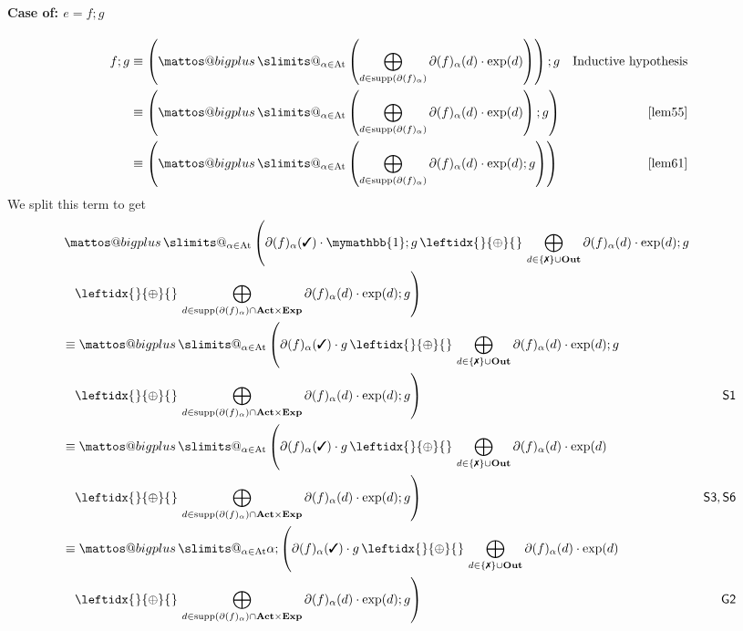\documentclass[a4paper,UKenglish,cleveref, autoref, thm-restate]{lipics-v2021}
\makeatletter
\newcommand{\cmark}{\text{\ding{51}}}
\newcommand{\xmark}{\text{\ding{55}}}
\newcommand{\Out}{\textbf{\upshape{Out}}}
\newcommand{\Act}{\textbf{\upshape{Act}}}
\newcommand{\At}{\text{\upshape{At}}}
\newcommand{\Exp}{\textbf{\upshape{Exp}}}
\newcommand{\WC}[2]{\,\leftidx{_{#1}}{{\oplus}}{_{#2}}\,}
\newcommand{\Ax}[1]{\ensuremath{\mathsf{#1}}}
\newcommand{\bskip}{\mymathbb{1}}
\theoremstyle{plain}\newtheoremrep{thm}{Theorem}[section]
\newcommand{\bigplus}{\DOTSB\mathop{\mathpalette\mattos@bigplus\relax}\slimits@
}
\newcommand\mattos@bigplus[2]{\vcenter{\hbox{\sbox\z@{$#1\sum$}\resizebox{!}{0.9\dimexpr\ht\z@+\dp\z@}{\raisebox{\depth}{$\m@th#1+$}}}}\vphantom{\sum}}
\makeatother
\begin{document}
\begin{appendixproof}
	\paragraph*{Case of: $e= f;g$}
	\begin{align*}
		f;g &\equiv \left(\bigplus_{\alpha \in \At} \left(\bigoplus_{d \in \text{supp}(\partial(f)_\alpha)}\partial(f)_\alpha(d) \cdot \text{exp}(d)\right)\right);g& \text{Inductive hypothesis}\\
		&\equiv \left(\bigplus_{\alpha \in \At} \left(\bigoplus_{d \in \text{supp}(\partial(f)_\alpha)}\partial(f)_\alpha(d) \cdot \text{exp}(d)\right);g\right)& \cref{lem55}\\
		&\equiv \left(\bigplus_{\alpha \in \At} \left(\bigoplus_{d \in \text{supp}(\partial(f)_\alpha)}\partial(f)_\alpha(d) \cdot \text{exp}(d);g\right)\right)& \cref{lem61}
	\end{align*}
	We split this term to get
	\begin{align*}
		&\bigplus_{\alpha \in \At} \left(\partial(f)_\alpha(\cmark) \cdot \bskip;g \WC{}{} \bigoplus_{{\substack{d \in \{\xmark\} \cup \Out}}}\partial(f)_\alpha(d)\cdot \text{exp}(d);g  \right. \\ &\left. \;\;\WC{}{} \bigoplus_{{\substack{d \in \text{supp}(\partial(f)_\alpha)\cap \Act\times\Exp}}}\partial(f)_\alpha(d) \cdot \text{exp}(d);g\right)\\
		&\equiv \bigplus_{\alpha \in \At} \left(\partial(f)_\alpha(\cmark) \cdot g \WC{}{}  \bigoplus_{{\substack{d \in \{\xmark\} \cup \Out}}}\partial(f)_\alpha(d) \cdot \text{exp}(d);g \right. \\ &\left.\;\;\WC{}{} \bigoplus_{{\substack{d \in \text{supp}(\partial(f)_\alpha)\cap \Act\times\Exp}}}\partial(f)_\alpha(d) \cdot \text{exp}(d);g\right) & \Ax{S1}\\
		&\equiv \bigplus_{\alpha \in \At} \left(\partial(f)_\alpha(\cmark) \cdot g \WC{}{}  \bigoplus_{{\substack{d \in \{\xmark\} \cup \Out}}}\partial(f)_\alpha(d) \cdot \text{exp}(d) \right. \\ &\left.\;\;\WC{}{} \bigoplus_{{\substack{d \in \text{supp}(\partial(f)_\alpha)\cap \Act\times\Exp}}}\partial(f)_\alpha(d) \cdot \text{exp}(d);g\right) & \Ax{S3, S6}\\
		&\equiv \bigplus_{\alpha \in \At} \alpha;\left(\partial(f)_\alpha(\cmark) \cdot g \WC{}{}  \bigoplus_{{\substack{d \in \{\xmark\} \cup \Out}}}\partial(f)_\alpha(d) \cdot \text{exp}(d) \right. \\ &\left.\;\;\WC{}{} \bigoplus_{{\substack{d \in \text{supp}(\partial(f)_\alpha)\cap \Act\times\Exp}}}\partial(f)_\alpha(d) \cdot \text{exp}(d);g\right) & \Ax{G2}\\

\end{align*}
\end{appendixproof}
\end{document}
